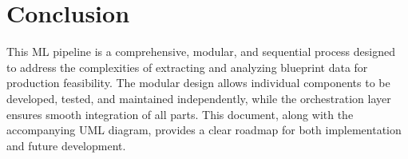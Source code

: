 \documentclass{article}
\begin{document}
\section{Conclusion}
This ML pipeline is a comprehensive, modular, and sequential process designed to address the complexities of extracting and analyzing blueprint data for production feasibility. The modular design allows individual components to be developed, tested, and maintained independently, while the orchestration layer ensures smooth integration of all parts. This document, along with the accompanying UML diagram, provides a clear roadmap for both implementation and future development.
\end{document}
